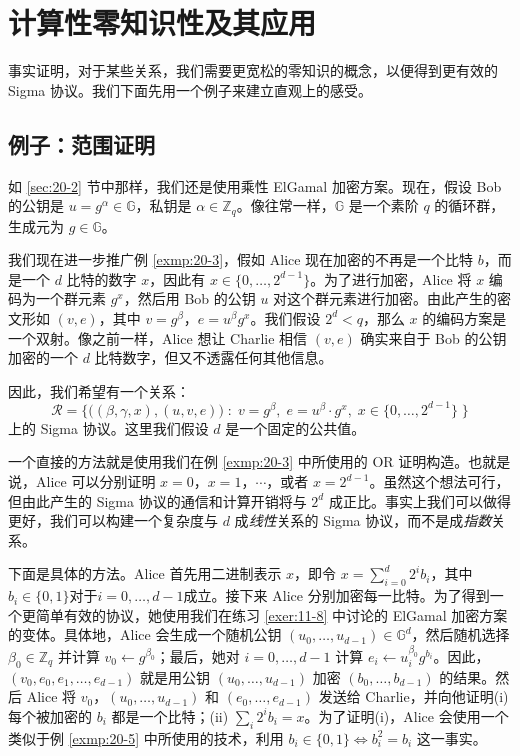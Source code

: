 \section{计算性零知识性及其应用}

事实证明，对于某些关系，我们需要更宽松的零知识的概念，以便得到更有效的 Sigma 协议。我们下面先用一个例子来建立直观上的感受。

\subsection{例子：范围证明}\label{subsec:20-4-1}

如 \ref{sec:20-2} 节中那样，我们还是使用乘性 ElGamal 加密方案。现在，假设 Bob 的公钥是 $u=g^\alpha\in\mathbb{G}$，私钥是 $\alpha\in\mathbb{Z}_q$。像往常一样，$\mathbb G$ 是一个素阶 $q$ 的循环群，生成元为 $g\in\mathbb{G}$。

我们现在进一步推广例 \ref{exmp:20-3}，假如 Alice 现在加密的不再是一个比特 $b$，而是一个 $d$ 比特的数字 $x$，因此有 $x\in\{0,\dots,2^{d-1}\}$。为了进行加密，Alice 将 $x$ 编码为一个群元素 $g^x$，然后用 Bob 的公钥 $u$ 对这个群元素进行加密。由此产生的密文形如 $(v,e)$，其中 $v=g^\beta$，$e=u^\beta g^x$。我们假设 $2^d<q$，那么 $x$ 的编码方案是一个双射。像之前一样，Alice 想让 Charlie 相信 $(v,e)$ 确实来自于 Bob 的公钥加密的一个 $d$ 比特数字，但又不透露任何其他信息。

因此，我们希望有一个关系：
\begin{equation}
\mathcal{R}=
\bigg\lbrace
\Big((\beta,\gamma,x),(u,v,e)\Big)\;:\;
v=g^\beta,\;
e=u^\beta\cdot g^x,\;
x\in\{0,\dots,2^{d-1}\}\;
\bigg\rbrace
\end{equation}
上的 Sigma 协议。这里我们假设 $d$ 是一个固定的公共值。

一个直接的方法就是使用我们在例 \ref{exmp:20-3} 中所使用的 OR 证明构造。也就是说，Alice 可以分别证明 $x=0$，$x=1$，$\cdots$，或者 $x=2^{d-1}$。虽然这个想法可行，但由此产生的 Sigma 协议的通信和计算开销将与 $2^d$ 成正比。事实上我们可以做得更好，我们可以构建一个复杂度与 $d$ 成\emph{线性}关系的 Sigma 协议，而不是成\emph{指数}关系。

下面是具体的方法。Alice 首先用二进制表示 $x$，即令 $x=\sum_{i=0}^d2^ib_i$，其中$b_i\in\{0,1\}$对于$i=0,\dots,d-1$成立。接下来 Alice 分别加密每一比特。为了得到一个更简单有效的协议，她使用我们在练习 \ref{exer:11-8} 中讨论的 ElGamal 加密方案的变体。具体地，Alice 会生成一个随机公钥 $(u_0,\dots,u_{d-1})\in\mathbb{G}^d$，然后随机选择 $\beta_0\in\mathbb{Z}_q$ 并计算 $v_0\leftarrow g^{\beta_0}$；最后，她对 $i=0,\dots,d-1$ 计算 $e_i\leftarrow u_i^{\beta_0}g^{b_i}$。因此，$(v_0,e_0,e_1,\dots,e_{d-1})$ 就是用公钥 $(u_0,\dots,u_{d-1})$ 加密 $(b_0,\dots,b_{d-1})$ 的结果。然后 Alice 将 $v_0$，$(u_0,\dots,u_{d-1})$ 和 $(e_0,\dots,e_{d-1})$ 发送给 Charlie，并向他证明(i)每个被加密的 $b_i$ 都是一个比特；(ii) $\sum_{i}2^ib_i=x$。为了证明(i)，Alice 会使用一个类似于例 \ref{exmp:20-5} 中所使用的技术，利用 $b_i\in\{0,1\}\iff b_i^2=b_i$ 这一事实。

